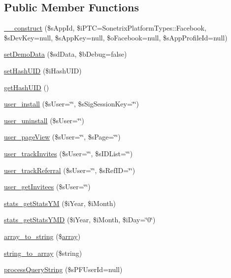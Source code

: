 \subsection*{Public Member Functions}
\begin{DoxyCompactItemize}
\item 
\hyperlink{classSonetrixClient_aa8a87ef1ba1c9f78959fcbd772429544}{\_\-\_\-construct} (\$sAppId, \$iPTC=SonetrixPlatformTypes::Facebook, \$sDevKey=null, \$sAppKey=null, \$oFacebook=null, \$sAppProfileId=null)
\item 
\hyperlink{classSonetrixClient_a2cccfe0c7f4aabf470d2d5f9f507e308}{setDemoData} (\$sdData, \$bDebug=false)
\item 
\hyperlink{classSonetrixClient_a681775b9584b96e7d2bcc9f9c0e529ae}{setHashUID} (\$iHashUID)
\item 
\hyperlink{classSonetrixClient_ab92d640a0f2167dc6ef8c9ee419a7f78}{getHashUID} ()
\item 
\hyperlink{classSonetrixClient_acefc468f5e6a8c55dae2b78e39d8a400}{user\_\-install} (\$sUser=\char`\"{}\char`\"{}, \$sSigSessionKey=\char`\"{}\char`\"{})
\item 
\hyperlink{classSonetrixClient_a9eca8f37b3a21b8f49476dff0aac1553}{user\_\-uninstall} (\$sUser=\char`\"{}\char`\"{})
\item 
\hyperlink{classSonetrixClient_a420b1ea102ea7dfe199366eea42cfc13}{user\_\-pageView} (\$sUser=\char`\"{}\char`\"{}, \$sPage=\char`\"{}\char`\"{})
\item 
\hyperlink{classSonetrixClient_a09ca56569d3a84b88e047acf61b86b35}{user\_\-trackInvites} (\$sUser=\char`\"{}\char`\"{}, \$sIDList=\char`\"{}\char`\"{})
\item 
\hyperlink{classSonetrixClient_ad18a1632dc984669877b26ad657b3b30}{user\_\-trackReferral} (\$sUser=\char`\"{}\char`\"{}, \$sRefID=\char`\"{}\char`\"{})
\item 
\hyperlink{classSonetrixClient_a780883e3c247b29d696d150b21f1da7d}{user\_\-getInvitees} (\$sUser=\char`\"{}\char`\"{})
\item 
\hyperlink{classSonetrixClient_a1441b0c5ef54c474618356b34ca2b82e}{stats\_\-getStatsYM} (\$iYear, \$iMonth)
\item 
\hyperlink{classSonetrixClient_a937ec2e1055b8ccfae32ab80f9a4302e}{stats\_\-getStatsYMD} (\$iYear, \$iMonth, \$iDay=\char`\"{}0\char`\"{})
\item 
\hyperlink{classSonetrixClient_a1e6fa40aeb089a6fb97fcbbe9ec10298}{array\_\-to\_\-string} (\$\hyperlink{list_8php_aa3205d038c7f8feb5c9f01ac4dfadc88}{array})
\item 
\hyperlink{classSonetrixClient_a22670c6ec1e99fa964f08a6419638341}{string\_\-to\_\-array} (\$string)
\item 
\hyperlink{classSonetrixClient_abd4a996c59fa716c190a9dfff3656b4e}{processQueryString} (\$sPFUserId=null)
\end{DoxyCompactItemize}
